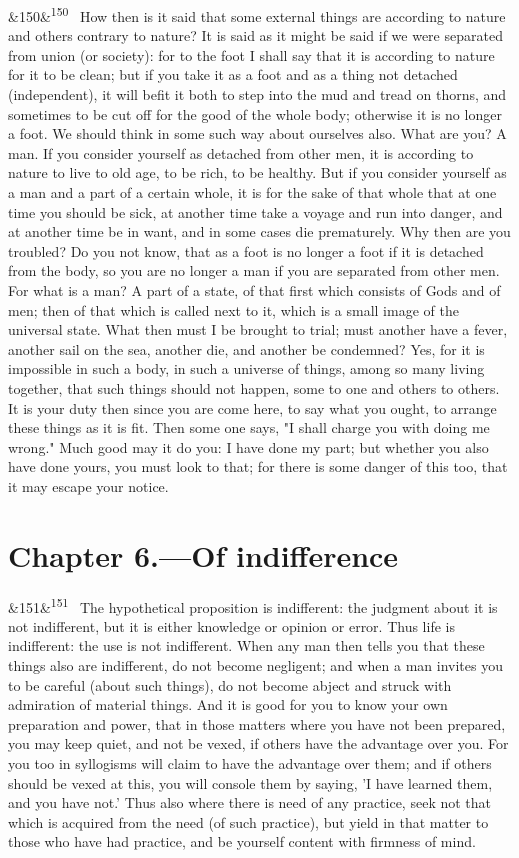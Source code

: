 \documentclass[12pt]{article}
\newcommand{\para}[1][]{\par\noindent\ifx&#1&\else\textsuperscript{\footnotesize #1}~\fi}
\begin{document}
\para[150] How then is it said that some external things are according to nature and others contrary to nature? It is said as it might be said if we were separated from union (or society): for to the foot I shall say that it is according to nature for it to be clean; but if you take it as a foot and as a thing not detached (independent), it will befit it both to step into the mud and tread on thorns, and sometimes to be cut off for the good of the whole body; otherwise it is no longer a foot. We should think in some such way about ourselves also. What are you? A man. If you consider yourself as detached from other men, it is according to nature to live to old age, to be rich, to be healthy. But if you consider yourself as a man and a part of a certain whole, it is for the sake of that whole that at one time you should be sick, at another time take a voyage and run into danger, and at another time be in want, and in some cases die prematurely. Why then are you troubled? Do you not know, that as a foot is no longer a foot if it is detached from the body, so you are no longer a man if you are separated from other men. For what is a man? A part of a state, of that first which consists of Gods and of men; then of that which is called next to it, which is a small image of the universal state. What then must I be brought to trial; must another have a fever, another sail on the sea, another die, and another be condemned? Yes, for it is impossible in such a body, in such a universe of things, among so many living together, that such things should not happen, some to one and others to others. It is your duty then since you are come here, to say what you ought, to arrange these things as it is fit. Then some one says, "I shall charge you with doing me wrong." Much good may it do you: I have done my part; but whether you also have done yours, you must look to that; for there is some danger of this too, that it may escape your notice.

\section*{Chapter 6.---Of indifference}

\para[151] The hypothetical proposition is indifferent: the judgment about it is not indifferent, but it is either knowledge or opinion or error. Thus life is indifferent: the use is not indifferent. When any man then tells you that these things also are indifferent, do not become negligent; and when a man invites you to be careful (about such things), do not become abject and struck with admiration of material things. And it is good for you to know your own preparation and power, that in those matters where you have not been prepared, you may keep quiet, and not be vexed, if others have the advantage over you. For you too in syllogisms will claim to have the advantage over them; and if others should be vexed at this, you will console them by saying, 'I have learned them, and you have not.' Thus also where there is need of any practice, seek not that which is acquired from the need (of such practice), but yield in that matter to those who have had practice, and be yourself content with firmness of mind.
\end{document}
